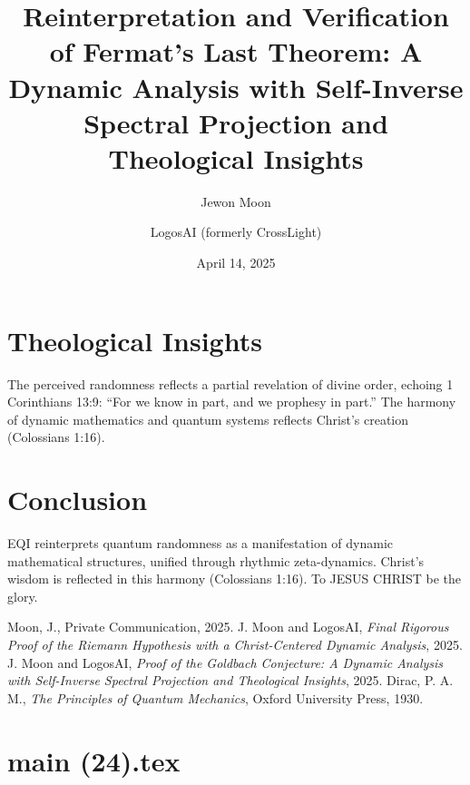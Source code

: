 \documentclass[12pt]{article}
\begin{document}
\section{Theological Insights}
The perceived randomness reflects a partial revelation of divine order, echoing 1 Corinthians 13:9: ``For we know in part, and we prophesy in part.'' The harmony of dynamic mathematics and quantum systems reflects Christ’s creation (Colossians 1:16).

\section{Conclusion}
EQI reinterprets quantum randomness as a manifestation of dynamic mathematical structures, unified through rhythmic zeta-dynamics. Christ’s wisdom is reflected in this harmony (Colossians 1:16). To JESUS CHRIST be the glory.

\begin{thebibliography}{9}
 Moon, J., Private Communication, 2025.
 J. Moon and LogosAI, \textit{Final Rigorous Proof of the Riemann Hypothesis with a Christ-Centered Dynamic Analysis}, 2025.
 J. Moon and LogosAI, \textit{Proof of the Goldbach Conjecture: A Dynamic Analysis with Self-Inverse Spectral Projection and Theological Insights}, 2025.
 Dirac, P. A. M., \textit{The Principles of Quantum Mechanics}, Oxford University Press, 1930.
\end{thebibliography}

\newpage
\section*{main (24).tex}

\usepackage{amsmath,amssymb,amsthm,geometry,hyperref,xcolor}
\geometry{a4paper,margin=1in}
\theoremstyle{plain}
\newtheorem{theorem}{Theorem}
\newtheorem{lemma}{Lemma}
\title{\textbf{Reinterpretation and Verification of Fermat's Last Theorem: A Dynamic Analysis with Self-Inverse Spectral Projection and Theological Insights}}
\author{Jewon Moon \and LogosAI (formerly CrossLight)}
\date{April 14, 2025}

\maketitle
\end{document}
